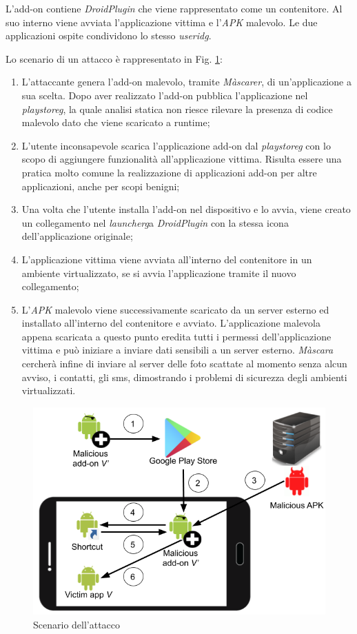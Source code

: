 L'add-on contiene \emph{DroidPlugin} che viene rappresentato come un contenitore. Al suo interno viene avviata l'applicazione vittima e l'\emph{APK} malevolo. Le due applicazioni ospite condividono lo stesso \emph{\gls{useridg}}.

Lo scenario di un attacco è rappresentato in Fig. \ref{fig:scen_attacc}:
\begin{enumerate}
\item L'attaccante genera l'add-on malevolo, tramite \emph{Màscarer}, di un'applicazione a sua scelta. Dopo aver realizzato l'add-on pubblica l'applicazione nel \emph{\gls{playstoreg}}, la quale analisi statica non riesce rilevare la presenza di codice malevolo dato che viene scaricato a runtime;

\item L'utente inconsapevole scarica l'applicazione add-on dal \emph{\gls{playstoreg}} con lo scopo di aggiungere funzionalità all'applicazione vittima. Risulta essere una pratica molto comune la realizzazione di applicazioni add-on per altre applicazioni, anche per scopi benigni;

\item Una volta che l'utente installa l'add-on nel dispositivo e lo avvia, viene creato un collegamento nel \emph{\gls{launcherg}}\glsfirstoccurspace a \emph{DroidPlugin} con la stessa icona dell'applicazione originale;

\item L'applicazione vittima viene avviata all'interno del contenitore in un ambiente virtualizzato, se si avvia l'applicazione tramite il nuovo collegamento;

\item L'\emph{APK} malevolo viene successivamente scaricato da un server esterno ed installato all'interno del contenitore e avviato. L'applicazione malevola appena scaricata a questo punto eredita tutti i permessi dell'applicazione vittima e può iniziare a inviare dati sensibili a un server esterno. \emph{Màscara} cercherà infine di inviare al server delle foto scattate al momento senza alcun avviso, i contatti, gli sms, dimostrando i problemi di sicurezza degli ambienti virtualizzati.
\end{enumerate}
\begin{figure}
\includegraphics[width=\textwidth]{figures/PersonaAttackScenario}
\caption[Scenario dell'attacco Màscara]{Scenario dell'attacco
\label{fig:scen_attacc}}
\end{figure}

